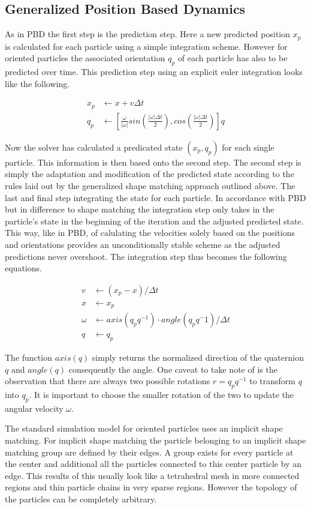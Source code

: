 \subsection{Generalized Position Based Dynamics}
As in PBD the first step is the prediction step. Here a new predicted position $x_p$ is calculated for each particle using a simple integration scheme. However for oriented particles the associated orientation $q_p$ of each particle has also to be predicted over time. This prediction step using an explicit euler integration looks like the following.

\begin{align}
x_p &\leftarrow x + v\Delta t \\
q_p &\leftarrow [\frac{\omega}{|\omega|}sin(\frac{|\omega|\Delta t}{2}), cos(\frac{|\omega|\Delta t}{2})]q
\end{align}

Now the solver has calculated a predicated state $(x_p,q_p)$ for each single particle. This information is then based onto the second step. The second step is simply the adaptation and modification of the predicted state according to the rules laid out by the generalized shape matching approach outlined above. The last and final step integrating the state for each particle. In accordance with PBD but in difference to shape matching the integration step only takes in the particle's state in the beginning of the iteration and the adjusted predicted state. This way, like in PBD, of calulating the velocities solely based on the positions and orientations provides an unconditionally stable scheme as the adjusted predictions never overshoot. The integration step thus becomes the following equations.

\begin{align}
v &\leftarrow (x_p - x)/\Delta t \\
x &\leftarrow x_p \\
\omega &\leftarrow axis(q_p q^{-1}) \cdot angle(q_p q^-1)/\Delta t \\
q &\leftarrow q_p
\end{align}

The function $axis(q)$ simply returns the normalized direction of the quaternion $q$ and $angle(q)$ consequently the angle. One caveat to take note of is the observation that there are always two possible rotations $r=q_pq^{-1}$ to transform $q$ into $q_p$. It is important to choose the smaller rotation of the two to update the angular velocity $\omega$.

The standard simulation model for oriented particles uses an implicit shape matching. For implicit shape matching the particle belonging to an implicit shape matching group are defined by their edges. A group exists for every particle at the center and additional all the particles connected to this center particle by an edge. This results of this usually look like a tetrahedral mesh in more connected regions and thin particle chains in very sparse regions. However the topology of the particles can be completely arbitrary.


